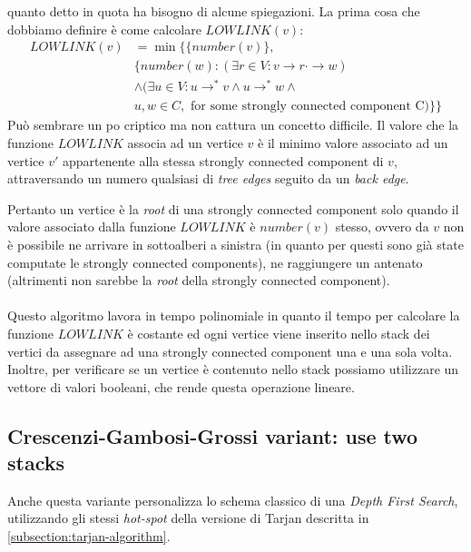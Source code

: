 quanto detto in quota ha bisogno di alcune spiegazioni. La prima cosa
che dobbiamo definire \`e come calcolare $LOWLINK(v)$:
\begin{displaymath}
  \begin{split}
    LOWLINK(v) &= \min\{\{number(v)\}, \\
    & \{number(w): (\exists r \in V: v \rightarrow r \cdot\rightarrow w) \\
    & \wedge (\exists u \in V: u \rightarrow^{*} v \wedge u
    \rightarrow^{*} w \wedge \\
    & u,w \in C, \text{ for some strongly connected component C}) \}\}
  \end{split}
\end{displaymath}
Pu\`o sembrare un po criptico ma non cattura un concetto difficile. Il
valore che la funzione $LOWLINK$ associa ad un vertice $v$ \`e il
minimo valore associato ad un vertice $v'$ appartenente alla stessa
strongly connected component di $v$, attraversando un numero qualsiasi
di \emph{tree edges} seguito da un \emph{back edge}.

Pertanto un vertice \`e la \emph{root} di una strongly connected
component solo quando il valore associato dalla funzione $LOWLINK$ \`e
$number(v)$ stesso, ovvero da $v$ non \`e possibile ne arrivare in
sottoalberi a sinistra (in quanto per questi sono gi\`a state
computate le strongly connected components), ne raggiungere un
antenato (altrimenti non sarebbe la \emph{root} della strongly
connected component).
\\\\
Questo algoritmo lavora in tempo polinomiale in quanto il tempo per
calcolare la funzione $LOWLINK$ \`e costante ed ogni vertice viene
inserito nello stack dei vertici da assegnare ad una strongly
connected component una e una sola volta. Inoltre, per verificare se
un vertice \`e contenuto nello stack possiamo utilizzare un vettore di
valori booleani, che rende questa operazione lineare.

\subsection{Crescenzi-Gambosi-Grossi variant: use two stacks}
\label{subsection:crescenzi-gambosi-grossi}
Anche questa variante personalizza lo schema classico di una
\emph{Depth First Search}, utilizzando gli stessi \emph{hot-spot}
della versione di Tarjan descritta in
\ref{subsection:tarjan-algorithm}. 

